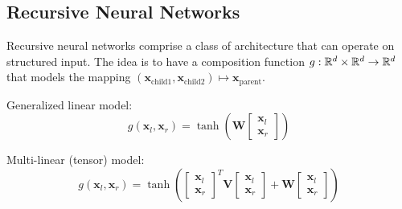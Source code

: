 \documentclass[12pt]{article}
\begin{document}
\subsection{Recursive Neural Networks}
Recursive neural networks comprise a class of architecture that can operate on structured input. The idea is to have a composition function $g: \mathbb{R}^d \times \mathbb{R}^d \rightarrow \mathbb{R}^d$ that  models the mapping $(\mathbf{x}_{\text{child1}},\mathbf{x}_{\text{child2}}) \mapsto \mathbf{x}_{\text{parent}}$.
\ulb
\item Generalized linear model:
\[ g(\mathbf{x}_l, \mathbf{x}_r) = \tanh \left(
\mathbf{W}
\begin{bmatrix}
\mathbf{x}_l \\ \mathbf{x}_r
\end{bmatrix}
\right) \]
\item Multi-linear (tensor) model:
\[ g(\mathbf{x}_l, \mathbf{x}_r) = \tanh \left(
\begin{bmatrix}
\mathbf{x}_l \\ \mathbf{x}_r
\end{bmatrix}^T
\mathbf{V}
\begin{bmatrix}
\mathbf{x}_l \\ \mathbf{x}_r
\end{bmatrix}
+ \mathbf{W}
\begin{bmatrix}
\mathbf{x}_l \\ \mathbf{x}_r
\end{bmatrix}
\right) \]
\ule
\end{document}
